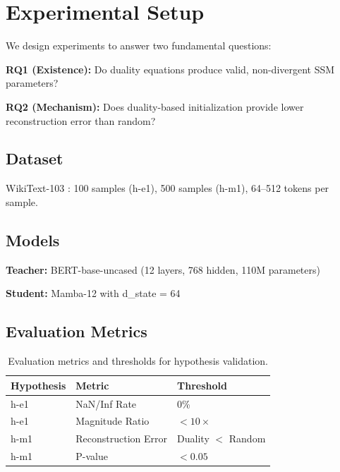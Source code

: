 \section{Experimental Setup}
\label{sec:experimental_setup}

We design experiments to answer two fundamental questions:

\textbf{RQ1 (Existence):} Do duality equations produce valid, non-divergent SSM parameters?

\textbf{RQ2 (Mechanism):} Does duality-based initialization provide lower reconstruction error than random?

\subsection{Dataset}

WikiText-103 \cite{merity2017wikitext}: 100 samples (h-e1), 500 samples (h-m1), 64--512 tokens per sample.

\subsection{Models}

\textbf{Teacher:} BERT-base-uncased (12 layers, 768 hidden, 110M parameters) \cite{devlin2019bert}

\textbf{Student:} Mamba-12 with d\_state = 64

\subsection{Evaluation Metrics}

\begin{table}[h]
\centering
\begin{tabular}{@{}lll@{}}
\toprule
Hypothesis & Metric & Threshold \\
\midrule
h-e1 & NaN/Inf Rate & 0\% \\
h-e1 & Magnitude Ratio & $< 10\times$ \\
h-m1 & Reconstruction Error & Duality $<$ Random \\
h-m1 & P-value & $< 0.05$ \\
\bottomrule
\end{tabular}
\caption{Evaluation metrics and thresholds for hypothesis validation.}
\label{tab:metrics}
\end{table}
